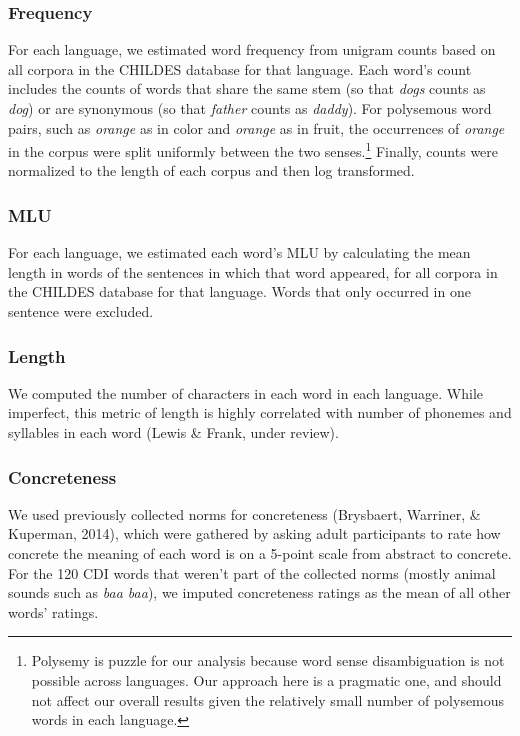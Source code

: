 \documentclass[10pt, letterpaper]{article}
\begin{document}
\subsubsection{Frequency}\label{frequency}

For each language, we estimated word frequency from unigram counts based
on all corpora in the CHILDES database for that language. Each word's
count includes the counts of words that share the same stem (so that
\emph{dogs} counts as \emph{dog}) or are synonymous (so that
\emph{father} counts as \emph{daddy}). For polysemous word pairs, such
as \emph{orange} as in color and \emph{orange} as in fruit, the
occurrences of \emph{orange} in the corpus were split uniformly between
the two
senses.\footnote{Polysemy is puzzle for our analysis because word sense disambiguation is not possible across languages. Our approach here is a pragmatic one, and should not affect our overall results given the relatively small number of polysemous words in each language.}
Finally, counts were normalized to the length of each corpus and then
log transformed.

\subsubsection{MLU}\label{mlu}

For each language, we estimated each word's MLU by calculating the mean
length in words of the sentences in which that word appeared, for all
corpora in the CHILDES database for that language. Words that only
occurred in one sentence were excluded.

\subsubsection{Length}\label{length}

We computed the number of characters in each word in each language.
While imperfect, this metric of length is highly correlated with number
of phonemes and syllables in each word (Lewis \& Frank, under review).

\subsubsection{Concreteness}\label{concreteness}

We used previously collected norms for concreteness (Brysbaert,
Warriner, \& Kuperman, 2014), which were gathered by asking adult
participants to rate how concrete the meaning of each word is on a
5-point scale from abstract to concrete. For the 120 CDI words that
weren't part of the collected norms (mostly animal sounds such as
\emph{baa baa}), we imputed concreteness ratings as the mean of all
other words' ratings.
\end{document}
